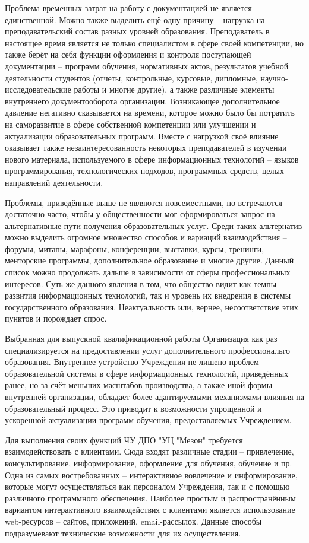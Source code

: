 Проблема временных затрат на работу с документацией не является единственной.
Можно также выделить ещё одну причину -- нагрузка на преподавательский состав разных уровней образования.
Преподаватель в настоящее время является не только специалистом в сфере своей компетенции, но также берёт на себя функции оформления и контроля поступающей документации -- программ обучения, нормативных актов, результатов учебной деятельности студентов (отчеты, контрольные, курсовые, дипломные, научно-исследовательские работы и многие другие), а также различные элементы внутреннего документооборота организации.
Возникающее дополнительное давление негативно сказывается на времени, которое можно было бы потратить на саморазвитие в сфере собственной компетенции или улучшении и актуализации образовательных программ.
Вместе с нагрузкой своё влияние оказывает также незаинтересованность некоторых преподавателей в изучении нового материала, используемого в сфере информационных технологий -- языков программирования, технологических подходов, программных средств, целых направлений деятельности.

Проблемы, приведённые выше не являются повсеместными, но встречаются достаточно часто, чтобы у общественности мог сформироваться запрос на альтернативные пути получения образовательных услуг.
Среди таких альтернатив можно выделить огромное множество способов и вариаций взаимодействия -- форумы, митапы, марафоны, конференции, выставки, курсы, тренинги, менторские программы, дополнительное образование и многие другие.
Данный список можно продолжать дальше в зависимости от сферы профессиональных интересов.
Суть же данного явления в том, что общество видит как темпы развития информационных технологий, так и уровень их внедрения в системы государственного образования.
Неактуальность или, вернее, несоответствие этих пунктов и порождает спрос.

Выбранная для выпускной квалификационной работы Организация как раз специализируется на предоставлении услуг дополнительного профессиональго образования.
Внутреннее устройство Учреждения не лишено проблем образовательной системы в сфере информационных технологий, приведённых ранее, но за счёт меньших масштабов производства, а также иной формы внутренней организации, обладает более адаптируемыми механизмами влияния на образовательный процесс.
Это приводит к возможности упрощенной и ускоренной актуализации программ обучения, предоставляемых Учреждением.

Для выполнения своих функций ЧУ ДПО "УЦ "Мезон" требуется взаимодействовать с клиентами.
Сюда входят различные стадии -- привлечение, консультирование, информирование, оформление для обучения, обучение и пр.
Одна из самых востребованных -- интерактивное вовлечение и информирование, которые могут осуществляться как персоналом Учреждения, так и с помощью различного программного обеспечения.
Наиболее простым и распространённым вариантом интерактивного взаимодействия с клиентами является использование web-ресурсов -- сайтов, приложений, email-рассылок.
Данные способы подразумевают технические возможности для их осуществления.

